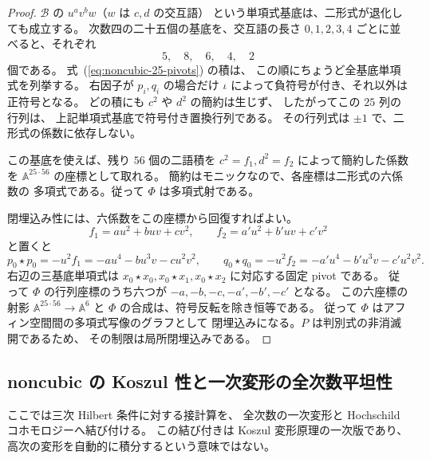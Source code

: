 \begin{proof}
$\mathcal B$ の $u^av^bw$（$w$ は $c,d$ の交互語）
という単項式基底は、二形式が退化しても成立する。
次数四の二十五個の基底を、交互語の長さ
$0,1,2,3,4$ ごとに並べると、それぞれ
\[
 5,\quad 8,\quad 6,\quad4,\quad2
\]
個である。
式~(\ref{eq:noncubic-25-pivots}) の積は、
この順にちょうど全基底単項式を列挙する。
右因子が $p_i,q_i$ の場合だけ
$\iota$ によって負符号が付き、それ以外は正符号となる。
どの積にも $c^2$ や $d^2$ の簡約は生じず、
したがってこの $25$ 列の行列は、
上記単項式基底で符号付き置換行列である。
その行列式は $\pm1$ で、二形式の係数に依存しない。

この基底を使えば、残り $56$ 個の二語積を
$c^2=f_1,d^2=f_2$ によって簡約した係数を
$\mathbb A^{25\cdot56}$ の座標として取れる。
簡約はモニックなので、各座標は二形式の六係数の
多項式である。従って $\Phi$ は多項式射である。

閉埋込み性には、六係数をこの座標から回復すればよい。
\[
 f_1=a u^2+buv+c v^2,\qquad
 f_2=a' u^2+b'uv+c'v^2
\]
と置くと
\[
 p_0\star p_0=-u^2f_1
   =-a u^4-bu^3v-cu^2v^2,\qquad
 q_0\star q_0=-u^2f_2
   =-a'u^4-b'u^3v-c'u^2v^2.
\]
右辺の三基底単項式は
$x_0\star x_0,x_0\star x_1,x_0\star x_2$
に対応する固定 pivot である。
従って $\Phi$ の行列座標のうち六つが
$-a,-b,-c,-a',-b',-c'$ となる。
この六座標の射影
$\mathbb A^{25\cdot56}\to\mathbb A^6$
と $\Phi$ の合成は、符号反転を除き恒等である。
従って $\Phi$ はアフィン空間間の多項式写像のグラフとして
閉埋込みになる。$P$ は判別式の非消滅開であるため、
その制限は局所閉埋込みである。
\end{proof}

\subsection{noncubic の Koszul 性と一次変形の全次数平坦性}
\label{subsec:noncubic-koszul-infinitesimal}

ここでは三次 Hilbert 条件に対する接計算を、
全次数の一次変形と Hochschild コホモロジーへ結び付ける。
この結び付きは Koszul 変形原理の一次版であり、
高次の変形を自動的に積分するという意味ではない。

